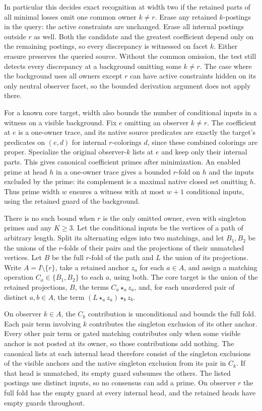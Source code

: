 In particular this decides exact recognition at width
two if the retained parts of all minimal losses omit
one common owner $k\ne r$. Erase any retained
$k$-postings in the query: the active constraints
are unchanged. Erase all internal postings outside
$r$ as well. Both the candidate and the greatest
coefficient depend only on the remaining postings,
so every discrepancy is witnessed on facet $k$.
Either erasure preserves the queried source.
Without the common omission, the test still detects
every discrepancy at a background omitting some
$k\ne r$. The case where the background uses all
owners except $r$ can have active constraints hidden
on its only neutral observer facet, so the bounded
derivation argument does not apply there.

For a known core target, width also bounds the
number of conditional inputs in a witness on a
visible background. Fix $e$ omitting an observer
$k\ne r$. The coefficient at $e$ is a one-owner
trace, and its native source predicates are
exactly the target's predicates on $(e,d)$ for
internal $r$-colorings $d$, since these combined
colorings are proper. Specialize the original
observer-$k$ lists at $e$ and keep only their
internal parts. This gives canonical coefficient
primes after minimization. An enabled prime at
head $h$ in a one-owner trace gives a bounded
$r$-fold on $h$ and the inputs excluded by the
prime: its complement is a maximal native
closed set omitting $h$. Thus prime width $w$
ensures a witness with at most $w+1$ conditional
inputs, using the retained guard of the
background.

There is no such bound when $r$ is the only
omitted owner, even with singleton primes
and any $K\geq3$. Let the conditional inputs
be the vertices of a path of arbitrary length.
Split its alternating edges into two matchings,
and let $B_1,B_2$ be the unions of the $r$-folds
of their pairs and the projections of their
unmatched vertices. Let $B$ be the full $r$-fold
of the path and $L$ the union of its projections.
Write $A=I\setminus\{r\}$, take a retained
anchor $z_a$ for each $a\in A$, and assign a
matching operation $C_a\in\{B_1,B_2\}$ to each
$a$, using both. The core target is the union of
the retained projections, $B$, the terms
$C_a\star_a z_a$, and, for each unordered pair
of distinct $a,b\in A$, the term
$(L\star_a z_a)\star_b z_b$.

On observer $k\in A$, the $C_k$ contribution
is unconditional and bounds the full fold.
Each pair term involving $k$ contributes the
singleton exclusion of its other anchor. Every
other pair term or gated matching contributes
only when some visible anchor is not posted
at its owner, so those contributions add
nothing. The canonical lists at each internal
head therefore consist of the singleton
exclusions of the visible anchors and the
native singleton exclusion from its pair
in $C_k$. If that head is unmatched, its
empty guard subsumes the others. The listed
postings use distinct inputs, so no consensus
can add a prime. On observer $r$ the full fold
has the empty guard at every internal head,
and the retained heads have empty guards
throughout.

